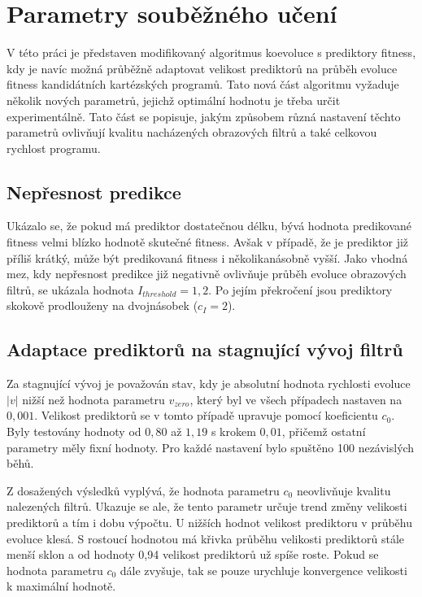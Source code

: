 \section{Parametry souběžného učení}

V této práci je představen modifikovaný algoritmus koevoluce s prediktory fitness, kdy je navíc možná průběžně adaptovat velikost prediktorů na průběh evoluce fitness kandidátních kartézských programů. Tato nová část algoritmu vyžaduje několik nových parametrů, jejichž optimální hodnotu je třeba určit experimentálně. Tato část se popisuje, jakým způsobem různá nastavení těchto parametrů ovlivňují kvalitu nacházených obrazových filtrů a také celkovou rychlost programu.

\subsection{Nepřesnost predikce}

Ukázalo se, že pokud má prediktor dostatečnou délku, bývá hodnota predikované fitness velmi blízko hodnotě skutečné fitness. Avšak v případě, že je prediktor již příliš krátký, může být predikovaná fitness i několikanásobně vyšší. Jako vhodná mez, kdy nepřesnost predikce již negativně ovlivňuje průběh evoluce obrazových filtrů, se ukázala hodnota $I_\mathit{threshold} = 1,2$. Po jejím překročení jsou prediktory skokově prodlouženy na dvojnásobek ($c_I = 2$).

\subsection{Adaptace prediktorů na stagnující vývoj filtrů}

Za stagnující vývoj je považován stav, kdy je absolutní hodnota rychlosti evoluce $|v|$ nižší než hodnota parametru $v_\mathit{zero}$, který byl ve všech případech nastaven na $0,001$. Velikost prediktorů se v tomto případě upravuje pomocí koeficientu $c_0$. Byly testovány hodnoty od $0,80$ až $1,19$ s krokem $0,01$, přičemž ostatní parametry měly fixní hodnoty. Pro každé nastavení bylo spuštěno 100 nezávislých běhů.

Z dosažených výsledků vyplývá, že hodnota parametru $c_0$ neovlivňuje kvalitu nalezených filtrů. Ukazuje se ale, že tento parametr určuje trend změny velikosti prediktorů a tím i dobu výpočtu. U nižších hodnot velikost prediktoru v průběhu evoluce klesá. S rostoucí hodnotou má křivka průběhu velikosti prediktorů stále menší sklon a od hodnoty 0,94 velikost prediktorů už spíše roste. Pokud se hodnota parametru $c_0$ dále zvyšuje, tak se pouze urychluje konvergence velikosti k maximální hodnotě.


